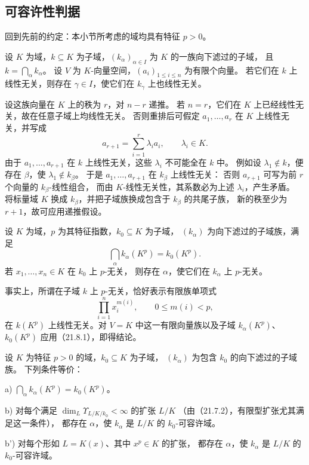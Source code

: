 \subsection{可容许性判据}
回到先前的约定：本小节所考虑的域均具有特征 $p>0$。

设 $K$ 为域，$k\subseteq K$ 为子域，$(k_\alpha)_{\alpha\in I}$ 为 $K$ 的一族向下滤过的子域，
且 $k=\bigcap_\alpha k_\alpha$。
设 $V$ 为 $K$-向量空间，$(a_i)_{1\le i\le n}$ 为有限个向量。
若它们在 $k$ 上线性无关，则存在 $\gamma\in I$，使它们在 $k_\gamma$ 上也线性无关。

\eproof
设这族向量在 $K$ 上的秩为 $r$，对 $n-r$ 递推。
若 $n=r$，它们在 $K$ 上已经线性无关，故在任意子域上均线性无关。
否则重排后可假定 $a_1,\ldots,a_r$ 在 $K$ 上线性无关，并写成
\[
 a_{r+1}=\sum_{i=1}^r\lambda_i a_i,\qquad\lambda_i\in K.
\]
由于 $a_1,\ldots,a_{r+1}$ 在 $k$ 上线性无关，这些 $\lambda_i$ 不可能全在 $k$ 中。
例如设 $\lambda_1\notin k$，便存在 $\beta$，使 $\lambda_1\notin k_\beta$。
于是 $a_1,\ldots,a_{r+1}$ 在 $k_\beta$ 上线性无关：
否则 $a_{r+1}$ 可写为前 $r$ 个向量的 $k_\beta$-线性组合，
而由 $K$-线性无关性，其系数必为上述 $\lambda_i$，产生矛盾。
将标量域 $K$ 换成 $k_\beta$，并把子域族换成包含于 $k_\beta$ 的共尾子族，
新的秩至少为 $r+1$，故可应用递推假设。
\finishproof

设 $K$ 为域，$p$ 为其特征指数，$k_0\subseteq K$ 为子域，
$(k_\alpha)$ 为向下滤过的子域族，满足
\[
 \bigcap_\alpha k_\alpha(K^p)=k_0(K^p).
\]
若 $x_1,\ldots,x_n\in K$ 在 $k_0$ 上 $p$-无关，
则存在 $\alpha$，使它们在 $k_\alpha$ 上 $p$-无关。

事实上，所谓在子域 $k$ 上 $p$-无关，恰好表示有限族单项式
\[
 \prod_{i=1}^n x_i^{m(i)},\qquad0\le m(i)<p,
\]
在 $k(K^p)$ 上线性无关。对 $V=K$ 中这一有限向量族以及子域
$k_\alpha(K^p)$、$k_0(K^p)$ 应用（21.8.1），即得结论。

设 $K$ 为特征 $p>0$ 的域，$k_0\subseteq K$ 为子域，
$(k_\alpha)$ 为包含 $k_0$ 的向下滤过的子域族。
下列条件等价：

\noindent a) $\displaystyle\bigcap_\alpha k_\alpha(K^p)=k_0(K^p)$。

\noindent b) 对每个满足 $\dim_L\Upsilon_{L/K/k_0}<\infty$ 的扩张 $L/K$
（由（21.7.2），有限型扩张尤其满足这一条件），
都存在 $\alpha$，使 $k_\alpha$ 是 $L/K$ 的 $k_0$-可容许域。

\noindent b') 对每个形如 $L=K(x)$、其中 $x^p\in K$ 的扩张，
都存在 $\alpha$，使 $k_\alpha$ 是 $L/K$ 的 $k_0$-可容许域。

